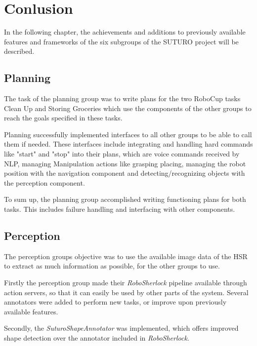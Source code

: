\documentclass[main.tex]{subfiles}
\begin{document}
	\begingroup

	\renewcommand{\cleardoublepage}{}

	\renewcommand{\clearpage}{}

	\chapter{Conlusion}
		In the following chapter, the achievements and additions to previously available features and frameworks of the six subgroups of the SUTURO project will be described.
		
		\section{Planning}
		The task of the planning group was to write plans for the two RoboCup tasks Clean Up and Storing Groceries which use the components of the other groups to reach the goals specified in these tasks.
		
		Planning successfully implemented interfaces to all other groups to be able to call them if needed. These interfaces include integrating and handling hard commands like "start" and "stop" into their plans, which are voice commands received by NLP, managing Manipulation actions like grasping placing, managing the robot position with the navigation component and detecting/recognizing objects with the perception component.
		
		To sum up, the planning group accomplished writing functioning plans for both tasks. This includes failure handling and interfacing with other components.
		
		\section{Perception}
		The perception groups objective was to use the available image data of the HSR to extract as much information as possible, for the other groups to use.
				
		Firstly the perception group made their \textit{RoboSherlock} pipeline available through action servers, so that it can easily be used by other parts of the system. Several annotators were added to perform new tasks, or improve upon previously available features. 
		
		Secondly, the \textit{SuturoShapeAnnotator} was implemented, which offers improved shape detection over the annotator included in \textit{RoboSherlock}. 
		
\end{document}
